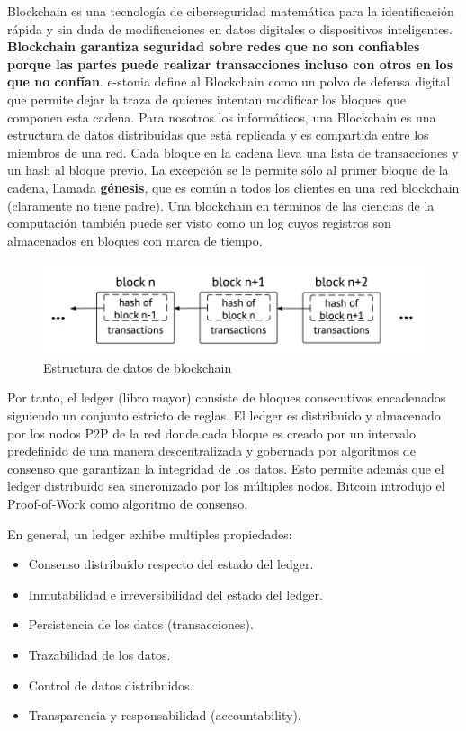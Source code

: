 Blockchain es una tecnología de ciberseguridad matemática para la identificación rápida y sin duda de modificaciones en datos digitales o dispositivos inteligentes.
\textbf{Blockchain garantiza seguridad sobre redes que no son confiables porque las partes puede realizar transacciones incluso con otros en los que no confían}. 
%
e-stonia define al Blockchain como un polvo de defensa digital que permite dejar la traza de quienes intentan modificar los bloques que componen esta cadena. 
%
Para nosotros los informáticos, una Blockchain es una estructura de datos distribuidas que está replicada y es compartida entre los miembros de una red. Cada bloque en la cadena lleva una lista de transacciones y un hash al bloque previo. La excepción se le permite sólo al primer bloque de la cadena, llamada \textbf{génesis}, que es común a todos los clientes en una red blockchain (claramente no tiene padre). Una blockchain en términos de las ciencias de la computación también puede ser visto como un log cuyos registros son almacenados en bloques con marca de tiempo. 

\begin{figure}
    \centering
    \includegraphics{Pictures/bloques.png}
    \caption{Estructura de datos de blockchain}
    \label{fig:estrdatos}
\end{figure}

%
Por tanto, el ledger (libro mayor) consiste de bloques consecutivos encadenados siguiendo un conjunto estricto de reglas. El ledger es distribuido y almacenado por los nodos P2P de la red donde cada bloque es creado por un intervalo predefinido de una manera descentralizada y gobernada por algoritmos de consenso que garantizan la integridad de los datos. Esto permite además que el ledger distribuido sea sincronizado por los múltiples nodos. Bitcoin introdujo el Proof-of-Work como algoritmo de consenso.


En general, un ledger exhibe multiples propiedades: 

\begin{itemize}
    \item Consenso distribuido respecto del estado del ledger.
    \item Inmutabilidad e irreversibilidad del estado del ledger. 
    \item Persistencia de los datos (transacciones).
    \item Trazabilidad de los datos.
    \item Control de datos distribuidos.
    \item Transparencia y responsabilidad (accountability).
\end{itemize}



